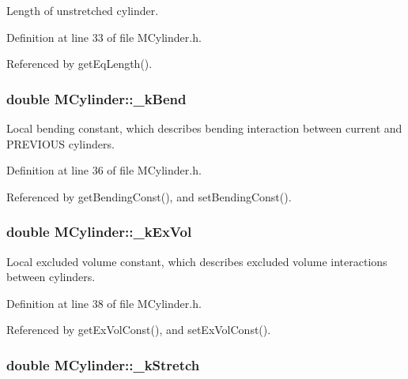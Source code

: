 Length of unstretched cylinder. 



Definition at line 33 of file M\+Cylinder.\+h.



Referenced by get\+Eq\+Length().

\hypertarget{classMCylinder_a49de338cc5d2d74356cf8da395a5fe54}{
\subsubsection[{\+\_\+k\+Bend}]{\setlength{\rightskip}{0pt plus 5cm}double M\+Cylinder\+::\+\_\+k\+Bend\hspace{0.3cm}{\ttfamily [private]}}}\label{classMCylinder_a49de338cc5d2d74356cf8da395a5fe54}


Local bending constant, which describes bending interaction between current and P\+R\+E\+V\+I\+O\+U\+S cylinders. 



Definition at line 36 of file M\+Cylinder.\+h.



Referenced by get\+Bending\+Const(), and set\+Bending\+Const().

\hypertarget{classMCylinder_a7393cc9a56c96bf924be20248aca0b4a}{
\subsubsection[{\+\_\+k\+Ex\+Vol}]{\setlength{\rightskip}{0pt plus 5cm}double M\+Cylinder\+::\+\_\+k\+Ex\+Vol\hspace{0.3cm}{\ttfamily [private]}}}\label{classMCylinder_a7393cc9a56c96bf924be20248aca0b4a}


Local excluded volume constant, which describes excluded volume interactions between cylinders. 



Definition at line 38 of file M\+Cylinder.\+h.



Referenced by get\+Ex\+Vol\+Const(), and set\+Ex\+Vol\+Const().

\hypertarget{classMCylinder_af153db32e79db040668aeea45fcfe594}{
\subsubsection[{\+\_\+k\+Stretch}]{\setlength{\rightskip}{0pt plus 5cm}double M\+Cylinder\+::\+\_\+k\+Stretch\hspace{0.3cm}{\ttfamily [private]}}}\label{classMCylinder_af153db32e79db040668aeea45fcfe594}


